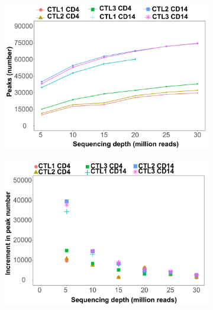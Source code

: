\begin{figure}[H]
\centering
\begin{subfigure}{0.48\textwidth}
\centering
\includegraphics[width=\textwidth]{./Results1/pdfs/ATAC_Core_fresh_CD4_CD14_num_peaks_vs_depth}
\caption{\textbf{}}
\end{subfigure} %
\begin{subfigure}{0.48\textwidth}
\centering
\includegraphics[width=\textwidth]{./Results1/pdfs/ATAC_Core_fresh_CD4_CD14_increment_num_peaks_vs_depth}
\caption{\textbf{}}
\end{subfigure} 
\begin{subfigure}{0.48\textwidth}
\centering

\end{subfigure}
\end{figure}
